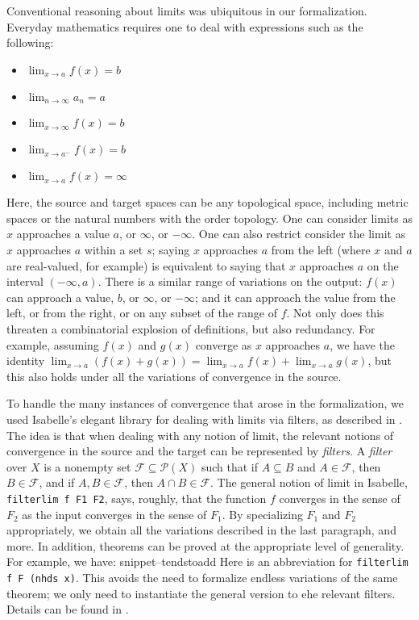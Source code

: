 \documentclass{svjour3}
\newcommand{\Snippet}[1]{\csname snippet--#1\endcsname}
\begin{document}
Conventional reasoning about limits was ubiquitous in our formalization. Everyday mathematics requires one to deal with expressions such as the following:
\begin{itemize}
 \item $\lim_{x \to a} f(x) = b$
 \item $\lim_{n \to \infty} a_n = a$
 \item $\lim_{x \to \infty} f(x) = b$
 \item $\lim_{x \to a^-} f(x) = b$
 \item $\lim_{x \to a} f(x) = \infty$
\end{itemize}
Here, the source and target spaces can be any topological space, including metric spaces or the natural numbers with the order topology. One can consider limits as $x$ approaches a value $a$, or $\infty$, or $-\infty$. One can also restrict consider the limit as $x$ approaches $a$ within a set $s$; saying $x$ approaches $a$ from the left (where $x$ and $a$ are real-valued, for example) is equivalent to saying that $x$ approaches $a$ on the interval $(-\infty, a)$. There is a similar range of variations on the output: $f(x)$ can approach a value, $b$, or $\infty$, or $-\infty$; and it can approach the value from the left, or from the right, or on any subset of the range of $f$. Not only does this threaten a combinatorial explosion of definitions, but also redundancy. For example, assuming $f(x)$ and $g(x)$ converge as $x$ approaches $a$, we have the identity $\lim_{x \to a} (f(x) + g(x)) = \lim_{x \to a} f(x) + \lim_{x \to a} g(x)$, but this also holds under all the variations of convergence in the source.

To handle the many instances of convergence that arose in the formalization, we used Isabelle's elegant library for dealing with limits via filters, as described in \cite{hoelzl:et:al:13}. The idea is that when dealing with any notion of limit, the relevant notions of convergence in the source and the target can be represented by \emph{filters}. A {\em filter} over $X$ is a nonempty set $\mathcal F \subseteq \mathcal P(X)$ such that if $A \subseteq B$ and $A \in \mathcal F$, then $B \in \mathcal F$, and if $A, B \in \mathcal F$, then $A \cap B \in \mathcal F$. The general notion of limit in Isabelle, {\tt filterlim f F1 F2}, says, roughly, that the function $f$ converges in the sense of $F_2$ as the input converges in the sense of $F_1$. By specializing $F_1$ and $F_2$ appropriately, we obtain all the variations described in the last paragraph, and more. In addition, theorems can be proved at the appropriate level of generality. For example, we have:
\Snippet{tendstoadd} 
Here  is an abbreviation for {\tt filterlim f F (nhds x)}. This avoids the need to formalize endless variations of the same theorem; we only need to instantiate the general version to ehe relevant filters. Details can be found in \cite{hoelzl:et:al:13}.
\end{document}
